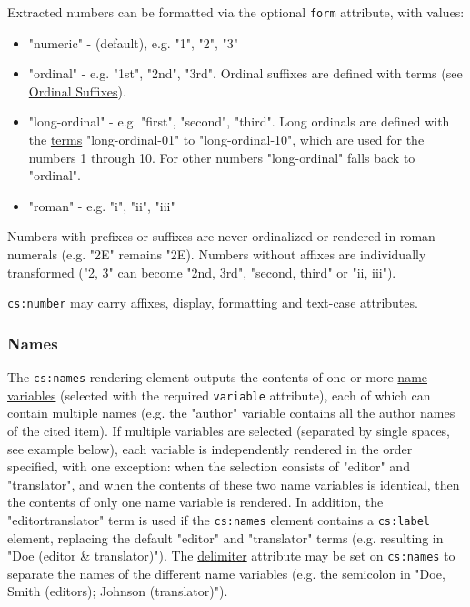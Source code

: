Extracted numbers can be formatted via the optional \texttt{form}
attribute, with values:

\begin{itemize}
\tightlist
\item
  "numeric" - (default), e.g. "1", "2", "3"
\item
  "ordinal" - e.g. "1st", "2nd", "3rd". Ordinal suffixes are defined
  with terms (see \protect\hyperlink{ordinal-suffixes}{Ordinal
  Suffixes}).
\item
  "long-ordinal" - e.g. "first", "second", "third". Long ordinals are
  defined with the \protect\hyperlink{terms}{terms} "long-ordinal-01" to
  "long-ordinal-10", which are used for the numbers 1 through 10. For
  other numbers "long-ordinal" falls back to "ordinal".
\item
  "roman" - e.g. "i", "ii", "iii"
\end{itemize}

Numbers with prefixes or suffixes are never ordinalized or rendered in
roman numerals (e.g. "2E" remains "2E). Numbers without affixes are
individually transformed ("2, 3" can become "2nd, 3rd", "second, third"
or "ii, iii").

\texttt{cs:number} may carry \protect\hyperlink{affixes}{affixes},
\protect\hyperlink{display}{display},
\protect\hyperlink{formatting}{formatting} and
\protect\hyperlink{text-case}{text-case} attributes.

\hypertarget{names}{%
\subsubsection{Names}\label{names}}

The \texttt{cs:names} rendering element outputs the contents of one or
more \protect\hyperlink{name-variables}{name variables} (selected with
the required \texttt{variable} attribute), each of which can contain
multiple names (e.g. the "author" variable contains all the author names
of the cited item). If multiple variables are selected (separated by
single spaces, see example below), each variable is independently
rendered in the order specified, with one exception: when the selection
consists of "editor" and "translator", and when the contents of these
two name variables is identical, then the contents of only one name
variable is rendered. In addition, the "editortranslator" term is used
if the \texttt{cs:names} element contains a \texttt{cs:label} element,
replacing the default "editor" and "translator" terms (e.g. resulting in
"Doe (editor \& translator)"). The
\protect\hyperlink{delimiter}{delimiter} attribute may be set on
\texttt{cs:names} to separate the names of the different name variables
(e.g. the semicolon in "Doe, Smith (editors); Johnson (translator)").

